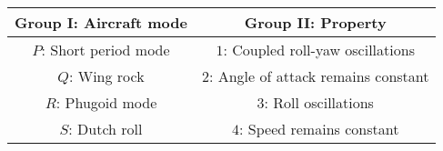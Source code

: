  \begin{tabular}{|c|c|}
    \hline
      Group I: Aircraft mode & Group II: Property\\
      \hline
        $P$: Short period mode& $1$: Coupled roll-yaw oscillations\\
        \hline
        $Q$: Wing rock & $2$: Angle of attack remains constant\\
        \hline
        $R$: Phugoid mode & $3$: Roll oscillations\\
        \hline
        $S$: Dutch roll& $4$: Speed remains constant\\
        \hline
 \end{tabular}

